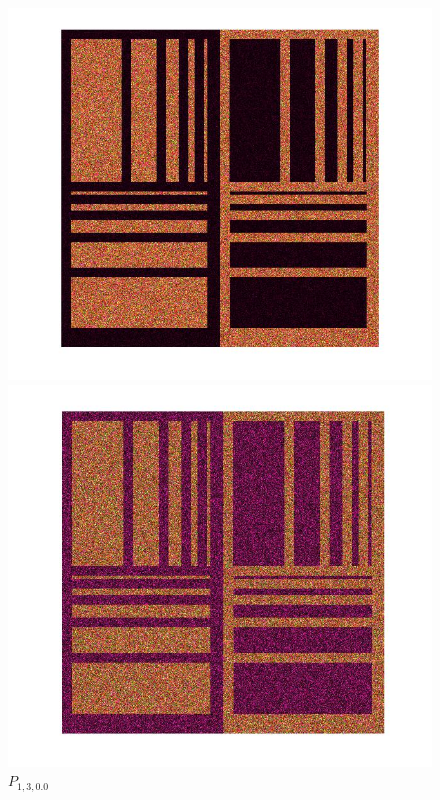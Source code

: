\documentclass[12pt,a4paper]{article}
\begin{document}
\begin{figure}[!htb]
  \includegraphics[width=\linewidth]{Eq_Phantom_0p000_1_2_1.jpg}
	\caption{$P_{1,2,0.0}$}\label{fig:awesome_image1}
\endminipage\hfill
{}
  \includegraphics[width=\linewidth]{Eq_Phantom_0p000_1_3_1.jpg}
	\caption{$P_{1,3,0.0}$}\label{fig:awesome_image1}
\endminipage\hfill
{}%

\end{figure}
\end{document}
